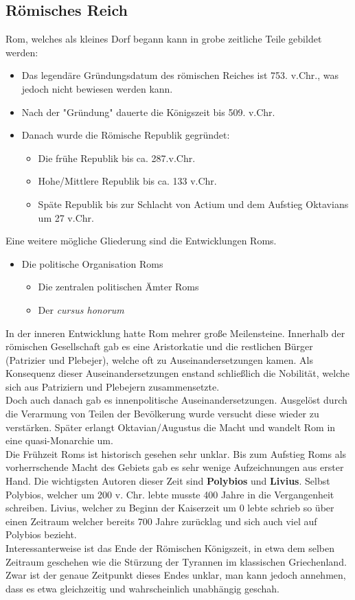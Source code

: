 \documentclass{article}
\begin{document}
	\subsection{Römisches Reich}
	Rom, welches als kleines Dorf begann kann in grobe zeitliche Teile gebildet werden:
	\begin{itemize}
		\item{Das legendäre Gründungsdatum des römischen Reiches ist 753. v.Chr., was jedoch nicht bewiesen werden kann.}
		\item{Nach der "Gründung" dauerte die Königszeit bis 509. v.Chr.}
		\item{Danach wurde die Römische Republik gegründet:}
		\begin{itemize}
			\item{Die frühe Republik bis ca. 287.v.Chr.}
			\item{Hohe/Mittlere Republik bis ca. 133 v.Chr.}
			\item{Späte Republik bis zur Schlacht von Actium und dem Aufstieg Oktavians um 27 v.Chr.}
		\end{itemize}
	\end{itemize}
	Eine weitere mögliche Gliederung sind die Entwicklungen Roms.
	\begin{itemize}
		\item{Die politische Organisation Roms}
		\begin{itemize}
			\item{Die zentralen politischen Ämter Roms}
			\item{Der \textit{cursus honorum}}
		\end{itemize}
	\end{itemize}
	In der inneren Entwicklung hatte Rom mehrer große Meilensteine. Innerhalb der römischen Gesellschaft gab es eine Aristorkatie und die restlichen Bürger (Patrizier und Plebejer), welche oft zu Auseinandersetzungen kamen. Als Konsequenz dieser Auseinandersetzungen enstand schließlich die Nobilität, welche sich aus Patriziern und Plebejern zusammensetzte. \\
	Doch auch danach gab es innenpolitische Auseinandersetzungen. Ausgelöst durch die Verarmung von Teilen der Bevölkerung wurde versucht diese wieder zu verstärken. Später erlangt Oktavian/Augustus die Macht und wandelt Rom in eine quasi-Monarchie um. \\
	Die Frühzeit Roms ist historisch gesehen sehr unklar. Bis zum Aufstieg Roms als vorherrschende Macht des Gebiets gab es sehr wenige Aufzeichnungen aus erster Hand. Die wichtigsten Autoren dieser Zeit sind \textbf{Polybios} und \textbf{Livius}. Selbst Polybios, welcher um 200 v. Chr. lebte musste 400 Jahre in die Vergangenheit schreiben. Livius, welcher zu Beginn der Kaiserzeit um 0 lebte schrieb so über einen Zeitraum welcher bereits 700 Jahre zurücklag und sich auch viel auf Polybios bezieht. \\
	Interessanterweise ist das Ende der Römischen Königszeit, in etwa dem selben Zeitraum geschehen wie die Stürzung der Tyrannen im klassischen Griechenland. Zwar ist der genaue Zeitpunkt dieses Endes unklar, man kann jedoch annehmen, dass es etwa gleichzeitig und wahrscheinlich unabhängig geschah.
\end{document}
